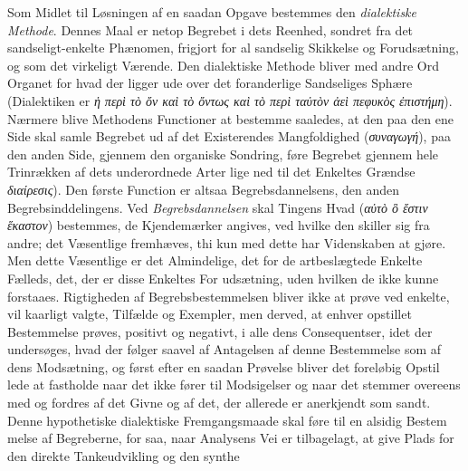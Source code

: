 \documentclass[12pt,a4paper]{book}
\newcommand{\gk}[1]{\textit{#1}}
\begin{document}
Som Midlet til Løsningen af en saadan Opgave bestemmes
den \emph{dialektiske Methode}. Dennes Maal er netop Begrebet
i dets Reenhed, sondret fra det sandseligt-enkelte Phænomen,
frigjort for al sandselig Skikkelse og Forudsætning, og som det
virkeligt Værende. Den dialektiske Methode bliver med andre
Ord Organet for hvad der ligger ude over det foranderlige
Sandseliges Sphære (Dialektiken er \gk{ἡ περὶ τὸ ὄν καὶ τὸ
ὄντως καὶ τὸ περὶ ταὐτὸν ἀεὶ πεφυκὸς ἐπιστήμη}). Nærmere
blive Methodens Functioner at bestemme saaledes, at den paa
den ene Side skal samle Begrebet ud af det Existerendes
Mangfoldighed (\gk{συναγωγή}), paa den anden Side, gjennem den
organiske Sondring, føre Begrebet gjennem hele Trinrækken af
dets underordnede Arter lige ned til det Enkeltes Grændse
\gk{διαίρεσις}). Den første Function er altsaa Begrebsdannelsens,
den anden Begrebsinddelingens. Ved \emph{Begrebsdannelsen}
skal Tingens Hvad (\gk{αὐτὸ ὃ ἔστιν ἕκαστον}) bestemmes, de
Kjendemærker angives, ved hvilke den skiller sig fra andre;
det Væsentlige fremhæves, thi kun med dette har Videnskaben
at gjøre. Men dette Væsentlige er det Almindelige, det for de
artbeslægtede Enkelte Fælleds, det, der er disse Enkeltes For\-%
udsætning, uden hvilken de ikke kunne forstaaes. Rigtigheden
af Begrebsbestemmelsen bliver ikke at prøve ved enkelte, vil\-%
kaarligt valgte, Tilfælde og Exempler, men derved, at enhver
opstillet Bestemmelse prøves, positivt og negativt, i alle dens
Consequentser, idet der undersøges, hvad der følger saavel af
Antagelsen af denne Bestemmelse som af dens Modsætning,
og først efter en saadan Prøvelse bliver det foreløbig Opstil\-%
lede at fastholde naar det ikke fører til Modsigelser og naar
det stemmer overeens med og fordres af det Givne og af det,
der allerede er anerkjendt som sandt. Denne hypothetiske
dialektiske Fremgangsmaade skal føre til en alsidig Bestem\-%
melse af Begreberne, for saa, naar Analysens Vei er tilbagelagt,
at give Plads for den direkte Tankeudvikling og den synthe\-%
\end{document}

